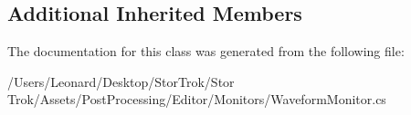 \subsection*{Additional Inherited Members}


The documentation for this class was generated from the following file\+:\begin{DoxyCompactItemize}
\item 
/\+Users/\+Leonard/\+Desktop/\+Stor\+Trok/\+Stor Trok/\+Assets/\+Post\+Processing/\+Editor/\+Monitors/Waveform\+Monitor.\+cs\end{DoxyCompactItemize}
